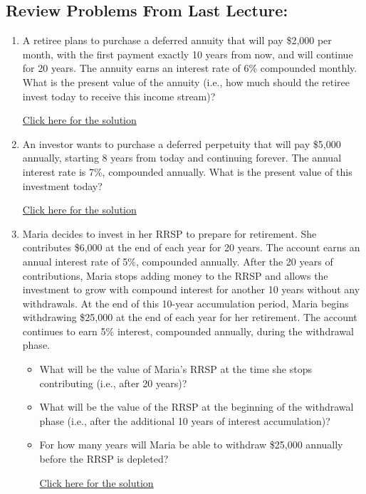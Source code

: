 \documentclass[
]{book}
\providecommand{\tightlist}{%
  \setlength{\itemsep}{0pt}\setlength{\parskip}{0pt}}
\begin{document}
\subsection*{Review Problems From Last Lecture:}\label{review-problems-from-last-lecture-14}

\begin{enumerate}
\def\labelenumi{\arabic{enumi}.}
\tightlist
\item
  A retiree plans to purchase a deferred annuity that will pay \$2,000 per month, with the first payment exactly 10 years from now, and will continue for 20 years. The annuity earns an interest rate of 6\% compounded monthly. What is the present value of the annuity (i.e., how much should the retiree invest today to receive this income stream)?

  \href{https://youtu.be/HVz-VL22-JI}{Click here for the solution}
\item
  An investor wants to purchase a deferred perpetuity that will pay \$5,000 annually, starting 8 years from today and continuing forever. The annual interest rate is 7\%, compounded annually. What is the present value of this investment today?

  \href{https://youtu.be/FHhqwkhFg9A}{Click here for the solution}
\item
  Maria decides to invest in her RRSP to prepare for retirement. She contributes \$6,000 at the end of each year for 20 years. The account earns an annual interest rate of 5\%, compounded annually. After the 20 years of contributions, Maria stops adding money to the RRSP and allows the investment to grow with compound interest for another 10 years without any withdrawals. At the end of this 10-year accumulation period, Maria begins withdrawing \$25,000 at the end of each year for her retirement. The account continues to earn 5\% interest, compounded annually, during the withdrawal phase.

  \begin{itemize}
  \tightlist
  \item
    What will be the value of Maria's RRSP at the time she stops contributing (i.e., after 20 years)?
  \item
    What will be the value of the RRSP at the beginning of the withdrawal phase (i.e., after the additional 10 years of interest accumulation)?
  \item
    For how many years will Maria be able to withdraw \$25,000 annually before the RRSP is depleted?

    \href{https://youtu.be/fwglKbNsHZ4}{Click here for the solution}
  \end{itemize}
\end{enumerate}
\end{document}
